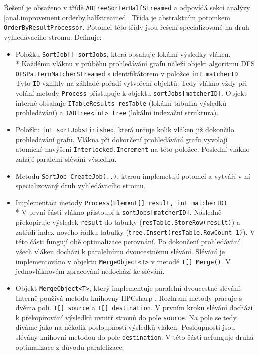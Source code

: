 Řešení je obsaženo v třídě \texttt{ABTreeSorterHalfStreamed} a odpovídá sekci analýzy \ref{anal.improvement.orderby.halfstreamed}.
Třída je abstraktním potomkem \texttt{OrderByResultProcessor}.
Potomci této třídy jsou řešení specializované na druh vyhledávacího stromu.
Definuje:
\begin{itemize}

\item Položku \texttt{SortJob[] sortJobs}, která obsahuje lokální výsledky vláken. \\*
Každému vláknu v průběhu prohledávání grafu náleží objekt algoritmu DFS \texttt{DFSPatternMatcherStreamed} s identifikátorem v položce \texttt{int matcherID}.
Tyto \texttt{ID} vznikly na základě pořadí vytvoření objektů.
Tedy vlákno vždy při volání metody \texttt{Process} přistupuje k objektu \texttt{sortJobs[matcherID]}. 
Objekt interně obsahuje \texttt{ITableResults resTable} (lokální tabulka výsledků prohledávání) a \texttt{IABTree<int> tree} (lokální indexační struktura).

\item Položku \texttt{int sortJobsFinished}, která určuje kolik vláken již dokončilo prohledávání grafu.
Vlákna při dokončení prohledávání grafu vyvolají atomické navýšení \texttt{Interlocked.Increment} na této položce.
Poslední vlákno zahájí paralelní slévání výsledků.

\item Metodu \texttt{SortJob CreateJob(..)}, kterou implemetují potomci a vytváří v ní specializovaný druh vyhledávacího stromu.

\item Implementaci metody \texttt{Process(Element[] result, int matcherID)}.\\*
V první části vlákno přistoupí k \texttt{sortJobs[matcherID]}. 
Následně překopíruje výsledek \texttt{result} do tabulky (\texttt{resTable.StoreRow(result)}) a zatřídí index nového řádku tabulky (\texttt{tree.Insert(resTable.RowCount-1)}).
V této části fungují obě optimalizace porovnání.
Po dokončení prohledávání všech vláken dochází k paralelnímu dvoucestnému slévání.
Slévání je implementováno v objektu \texttt{MergeObject<T>} v metodě \texttt{T[] Merge()}.
V jednovláknovém zpracování nedochází ke slévání.
\item Objekt \texttt{MergeObject<T>}, který implementuje paralelní dvoucestné slévání.
Interně používá metodu knihovny HPCsharp \citep{hpcsharp}.
Rozhraní metody pracuje s dvěma poli. 
\texttt{T[] source} a \texttt{T[] destination}.
V prvním kroku slévání dochází k překopírování výsledků uvnitř stromů do pole \texttt{source}.
Na pole se tedy díváme jako na několik posloupností výsledků vláken.
Posloupnosti jsou slévány knihovní metodou do pole \texttt{destination}.
V této části nefunguje druhá optimalizace z důvodu paralelizace.
\end{itemize}
